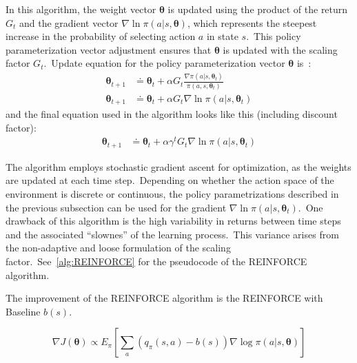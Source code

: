 \documentclass[../xlapes02]{subfiles}
\begin{document}
    In this algorithm, the weight vector $\bm{\theta}$ is updated using the product of the return $G_t$ and the gradient vector $\nabla \ln \pi(a | s, \bm{\theta})$, which represents the steepest increase in the probability of selecting action $a$ in state $s$.\ This policy parameterization vector adjustment ensures that $\bm{\theta}$ is updated with the scaling factor $G_t$.\ Update equation for the policy parameterization vector $\bm{\theta}$ is~\cite{FITMT25127, sutton2018reinforcement, rl-course-david-silver}:
    \begin{equation}
        \label{eq:REINFORCE}
        \begin{split}
            \bm{\theta}_{t+1}&\doteq\bm{\theta}_{t}+\alpha G_t \frac{\nabla\pi(a|s,\bm{\theta}_t)}{\pi(a,s,\bm{\theta}_t)}\\
            \bm{\theta}_{t+1}&\doteq\bm{\theta}_{t}+\alpha G_t \nabla\ln\pi(a|s,\bm{\theta}_t)
        \end{split}
    \end{equation}
    and the final equation used in the algorithm looks like this (including discount factor):
    \begin{equation}
        \label{eq:REINFORCE-final}
        \begin{split}
            \bm{\theta}_{t+1}&\doteq\bm{\theta}_{t}+\alpha\gamma^t G_t \nabla\ln\pi(a|s,\bm{\theta}_t)
        \end{split}
    \end{equation}

    The algorithm employs stochastic gradient ascent for optimization, as the weights are updated at each time step.\ Depending on whether the action space of the environment is discrete or continuous, the policy parametrizations described in the previous subsection can be used for the gradient $\nabla\ln\pi(a|s,\bm{\theta}_t)$.\ One drawback of this algorithm is the high variability in returns between time steps and the associated ``slownes'' of the learning process.\ This variance arises from the non-adaptive and loose formulation of the scaling factor.\ See~\cref{alg:REINFORCE} for the pseudocode of the REINFORCE algorithm.

    The improvement of the REINFORCE algorithm is the REINFORCE with Baseline $b(s)$.

    \begin{equation}
        \label{eq:REINFORCE_with_baseline}
        \nabla J(\bm{\theta})\propto E_{\pi}\left[\sum_{a}(q_\pi(s,a)-b(s))\nabla\log\pi(a|s,\bm{\theta})\right]
    \end{equation}
\end{document}
